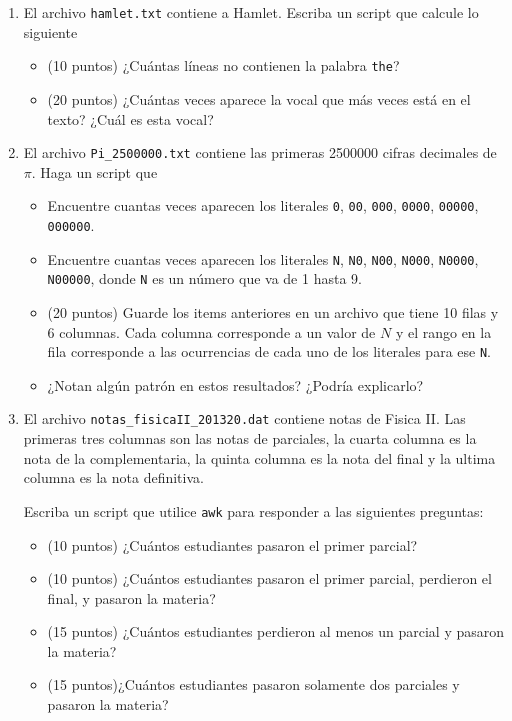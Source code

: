 \documentclass{article}
\begin{document}
\begin{enumerate}

\item El archivo \verb"hamlet.txt" contiene a Hamlet. Escriba un
  script que calcule lo siguiente
\begin{itemize}
\item (10 puntos) ¿Cu\'antas l\'ineas no contienen la palabra \verb"the"?
\item (20 puntos) ¿Cu\'antas veces aparece la vocal que m\'as veces est\'a en el
  texto? ¿Cuál es esta vocal? 
\end{itemize}

\item
El archivo \verb"Pi_2500000.txt" contiene las primeras 2500000 cifras
decimales de $\pi$.  Haga un script que 
\begin{itemize}
\item Encuentre cuantas veces aparecen los literales \verb"0",
  \verb"00", \verb"000", \verb"0000", \verb"00000", \verb"000000".
\item Encuentre cuantas veces aparecen los literales \verb"N",
  \verb"N0", \verb"N00", \verb"N000", \verb"N0000", \verb"N00000",
  donde \verb"N" es un n\'umero que va de 1 hasta 9.
\item (20 puntos) Guarde los items anteriores en un archivo que tiene
  10 filas y 6 columnas. Cada columna corresponde a un valor de $N$ y
  el rango en la fila corresponde a las ocurrencias de cada uno de los
  literales para ese \verb"N".
\item ¿Notan alg\'un patr\'on en estos resultados? ¿Podría explicarlo?
\end{itemize}


\item
El archivo \verb"notas_fisicaII_201320.dat" contiene notas de
Fisica II. Las primeras tres columnas son las notas de parciales, la
cuarta columna es la nota de la complementaria, la quinta columna es
la nota del final y la ultima columna es la nota definitiva. 

Escriba un script que utilice \verb"awk" para responder a las
siguientes preguntas: 
\begin{itemize}
\item (10 puntos) ¿Cu\'antos estudiantes pasaron el primer parcial?
\item (10 puntos) ¿Cu\'antos estudiantes pasaron el primer parcial,
  perdieron el final, y pasaron la materia?
\item (15 puntos) ¿Cu\'antos estudiantes perdieron al menos un parcial
  y pasaron la materia?
\item (15 puntos)¿Cu\'antos estudiantes pasaron solamente dos
  parciales y pasaron la materia? 
\end{itemize}


\end{enumerate}
\end{document}
